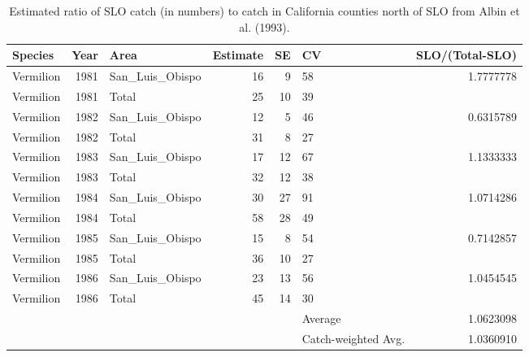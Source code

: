 \documentclass[11pt,
  english,
]{article}
\begin{document}
\FloatBarrier

\begin{table}[H]

\caption{\label{tab:albin-allocate}Estimated ratio of SLO catch (in numbers) to catch in California 
  counties north of SLO from Albin et al. (1993).}
\centering
\fontsize{10}{12}\selectfont
\begin{tabular}[t]{lrlrrlr}
\toprule
Species & Year & Area & Estimate & SE & CV & SLO/(Total-SLO)\\
\midrule
Vermilion & 1981 & San\_Luis\_Obispo & 16 & 9 & 58 & 1.7777778\\
Vermilion & 1981 & Total & 25 & 10 & 39 & \\
Vermilion & 1982 & San\_Luis\_Obispo & 12 & 5 & 46 & 0.6315789\\
Vermilion & 1982 & Total & 31 & 8 & 27 & \\
Vermilion & 1983 & San\_Luis\_Obispo & 17 & 12 & 67 & 1.1333333\\
Vermilion & 1983 & Total & 32 & 12 & 38 & \\
Vermilion & 1984 & San\_Luis\_Obispo & 30 & 27 & 91 & 1.0714286\\
Vermilion & 1984 & Total & 58 & 28 & 49 & \\
Vermilion & 1985 & San\_Luis\_Obispo & 15 & 8 & 54 & 0.7142857\\
Vermilion & 1985 & Total & 36 & 10 & 27 & \\
Vermilion & 1986 & San\_Luis\_Obispo & 23 & 13 & 56 & 1.0454545\\
Vermilion & 1986 & Total & 45 & 14 & 30 & \\
 &  &  &  &  & Average & 1.0623098\\
 &  &  &  &  & Catch-weighted Avg. & 1.0360910\\
\bottomrule
\end{tabular}
\end{table}
\end{document}
